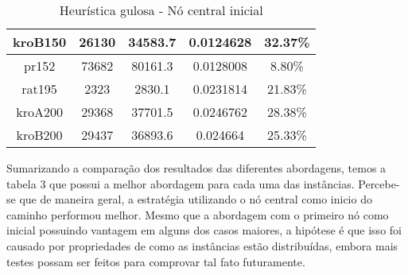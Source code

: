 \documentclass[10pt]{extarticle} %
\begin{document}
\begin{table}[H]
\begin{tabular}{|c|c|c|c|c|}
        kroB150           & 26130          & 34583.7        & 0.0124628        & 32.37\%        \\ \hline
        pr152             & 73682          & 80161.3        & 0.0128008        & 8.80\%         \\ \hline
        rat195            & 2323           & 2830.1         & 0.0231814        & 21.83\%        \\ \hline
        kroA200           & 29368          & 37701.5        & 0.0246762        & 28.38\%        \\ \hline
        kroB200           & 29437          & 36893.6        & 0.024664         & 25.33\%        \\ \hline
    \end{tabular}
    \caption{Heurística gulosa - Nó central inicial}
    \label{tab:my_label}
\end{table}

Sumarizando a comparação dos resultados das diferentes abordagens, temos a tabela 3 que possui a melhor abordagem para cada uma das instâncias. Percebe-se que de maneira geral, a estratégia utilizando o nó central como inicio do caminho performou melhor. Mesmo que a abordagem com o primeiro nó como inicial possuindo vantagem em alguns dos casos maiores, a hipótese é que isso foi causado por propriedades de como as instâncias estão distribuídas, embora mais testes possam ser feitos para comprovar tal fato futuramente. 
\end{document}
